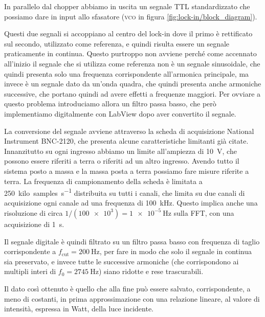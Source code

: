 \documentclass[prb,showpacs,floatfix,altaffilletter,amsmath,amssymb,reprint,citeautoscript,showkeys]{revtex4-1}
\begin{document}
In parallelo dal chopper abbiamo in uscita un segnale TTL standardizzato che possiamo dare in input allo sfasatore (\textsc{vco} in figura \ref{fig:lock-in/block_diagram}). 

Questi due segnali si accoppiano al centro del lock-in dove il primo è rettificato sul secondo, utilizzato come referenza, e quindi risulta essere un segnale praticamente in continua. Questo purtroppo non avviene perché come accennato all'inizio il segnale che si utilizza come referenza non è un segnale sinusoidale, che quindi presenta solo una frequenza corrispondente all'armonica principale, ma invece è un segnale dato da un'onda quadra, che quindi presenta anche armoniche successive, che portano quindi ad avere effetti a frequenze maggiori. Per ovviare a questo problema introduciamo allora un filtro passa basso, che però implementiamo digitalmente con LabView dopo aver convertito il segnale. 

La conversione del segnale avviene attraverso la scheda di acquisizione National Instrument BNC-2120, che presenta alcune caratteristiche limitanti già citate. Innanzitutto su ogni ingresso abbiamo un limite all'ampiezza di \SI{10}{\volt}, che possono essere riferiti a terra o riferiti ad un altro ingresso. Avendo tutto il sistema posto a massa e la massa posta a terra possiamo fare misure riferite a terra. La frequenza di campionamento della scheda è limitata a \SI{250}{kilo~samples\per\second} distribuita su tutti i canali, che limita su due canali di acquisizione ogni canale ad una frequenza di \SI{100}{\kilo\hertz}. Questo implica anche una risoluzione di circa $1/(\num{100e3})=\SI{1e-5}{\hertz}$ sulla FFT, con una acquisizione di \SI{1}{\second}. 

Il segnale digitale è quindi filtrato su un filtro passa basso con frequenza di taglio corrispondente a $f_\mathrm{cut}=\SI{200}{\hertz}$, per fare in modo che solo il segnale in continua sia preservato, e invece tutte le successive armoniche (che corrispondono ai multipli interi di $f_0=\SI{2745}{\hertz}$) siano ridotte e rese trascurabili. 

Il dato così ottenuto è quello che alla fine può essere salvato, corrispondente, a meno di costanti, in prima approssimazione con una relazione lineare, al valore di intensità, espressa in Watt, della luce incidente. 
\end{document}
